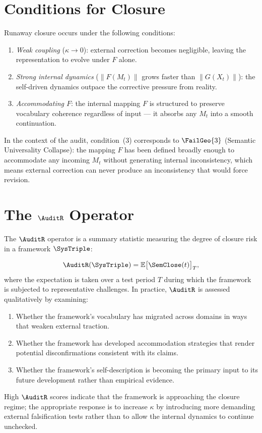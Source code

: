 \section{Conditions for Closure}
\label{app-f:conditions}

Runaway closure occurs under the following conditions:

\begin{enumerate}
  \item \textit{Weak coupling} ($\kappa \to 0$): external
  correction becomes negligible, leaving the representation
  to evolve under $F$ alone.
  \item \textit{Strong internal dynamics} ($\|F(M_t)\|$
  grows faster than $\|G(X_t)\|$): the self-driven
  dynamics outpace the corrective pressure from reality.
  \item \textit{Accommodating $F$}: the internal mapping
  $F$ is structured to preserve vocabulary coherence
  regardless of input --- it absorbs any $M_t$ into
  a smooth continuation.
\end{enumerate}

In the context of the \Ortyx{} audit, condition~(3)
corresponds to $\FailGeo{3}$ (Semantic Universality
Collapse): the mapping $F$ has been defined broadly
enough to accommodate any incoming $M_t$ without
generating internal inconsistency, which means external
correction can never produce an inconsistency that
would force revision.

\section{The $\AuditR$ Operator}
\label{app-f:audit-r}

The $\AuditR$ operator is a summary statistic measuring
the degree of closure risk in a framework $\SysTriple$:

\[
  \AuditR(\SysTriple) = \mathbb{E}\bigl[\SemClose(t)\bigr]_T,
\]
where the expectation is taken over a test period $T$
during which the framework is subjected to representative
challenges. In practice, $\AuditR$ is assessed qualitatively
by examining:

\begin{enumerate}
  \item Whether the framework's vocabulary has migrated
  across domains in ways that weaken external traction.
  \item Whether the framework has developed accommodation
  strategies that render potential disconfirmations
  consistent with its claims.
  \item Whether the framework's self-description is
  becoming the primary input to its future development
  rather than empirical evidence.
\end{enumerate}

High $\AuditR$ scores indicate that the framework is
approaching the closure regime; the appropriate response
is to increase $\kappa$ by introducing more demanding
external falsification tests rather than to allow the
internal dynamics to continue unchecked.
